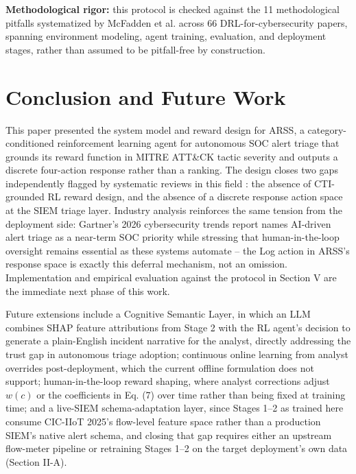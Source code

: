 \documentclass[conference]{IEEEtran}
\newcommand{\sev}{w}
\begin{document}
\textbf{Methodological rigor:} this protocol is checked against the 11 methodological pitfalls systematized by McFadden et al. \cite{sok_pitfalls2026} across 66 DRL-for-cybersecurity papers, spanning environment modeling, agent training, evaluation, and deployment stages, rather than assumed to be pitfall-free by construction.

\section{Conclusion and Future Work}

This paper presented the system model and reward design for ARSS, a category-conditioned reinforcement learning agent for autonomous SOC alert triage that grounds its reward function in MITRE ATT\&CK tactic severity and outputs a discrete four-action response rather than a ranking. The design closes two gaps independently flagged by systematic reviews in this field \cite{tariq2025,jalalvand2024}: the absence of CTI-grounded RL reward design, and the absence of a discrete response action space at the SIEM triage layer. Industry analysis reinforces the same tension from the deployment side: Gartner's 2026 cybersecurity trends report names AI-driven alert triage as a near-term SOC priority while stressing that human-in-the-loop oversight remains essential as these systems automate \cite{gartner2026} -- the Log action in ARSS's response space is exactly this deferral mechanism, not an omission. Implementation and empirical evaluation against the protocol in Section V are the immediate next phase of this work.

Future extensions include a Cognitive Semantic Layer, in which an LLM combines SHAP feature attributions \cite{shap2017} from Stage 2 with the RL agent's decision to generate a plain-English incident narrative for the analyst, directly addressing the trust gap in autonomous triage adoption; continuous online learning from analyst overrides post-deployment, which the current offline formulation does not support; human-in-the-loop reward shaping, where analyst corrections adjust $\sev(c)$ or the coefficients in Eq. (7) over time rather than being fixed at training time; and a live-SIEM schema-adaptation layer, since Stages 1--2 as trained here consume CIC-IIoT 2025's flow-level feature space rather than a production SIEM's native alert schema, and closing that gap requires either an upstream flow-meter pipeline or retraining Stages 1--2 on the target deployment's own data (Section II-A).
\end{document}
